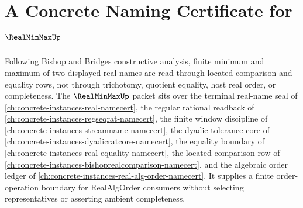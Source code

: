\chapter{A Concrete Naming Certificate for $\RealMinMaxUp$}
\label{ch:concrete-instances-real-min-max-namecert}

Following Bishop and Bridges constructive analysis, finite minimum and maximum of two displayed real names are read through located comparison and equality rows, not through trichotomy, quotient equality, host real order, or completeness. The $\RealMinMaxUp$ packet sits over the terminal real-name seal of \autoref{ch:concrete-instances-real-namecert}, the regular rational readback of \autoref{ch:concrete-instances-regseqrat-namecert}, the finite window discipline of \autoref{ch:concrete-instances-streamname-namecert}, the dyadic tolerance core of \autoref{ch:concrete-instances-dyadicratcore-namecert}, the equality boundary of \autoref{ch:concrete-instances-real-equality-namecert}, the located comparison row of \autoref{ch:concrete-instances-bishoprealcomparison-namecert}, and the algebraic order ledger of \autoref{ch:concrete-instances-real-alg-order-namecert}. It supplies a finite order-operation boundary for RealAlgOrder consumers without selecting representatives or asserting ambient completeness.

